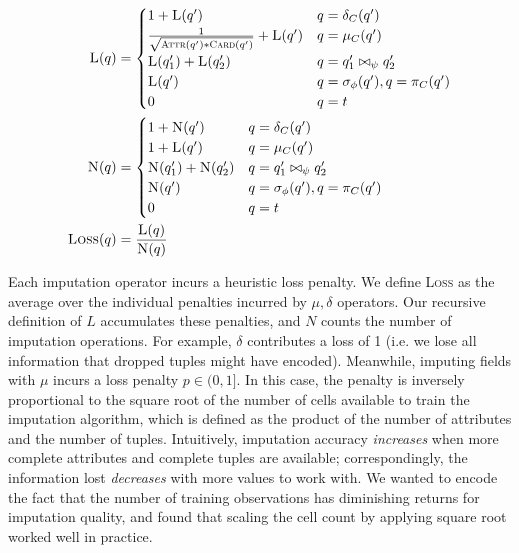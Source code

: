 \begin{align*}
  \textsc{L}(q) &= \begin{cases}
     1 + \textsc{L}(q') & q = \delta_C(q') \\
    \frac{1}{\sqrt{ \textsc{Attr}(q') * \textsc{Card}(q')}} + \textsc{L}(q')  & q = \mu_C(q') \\
    \textsc{L}(q_1') + \textsc{L}(q_2') & q = q_1' \bowtie_\psi q_2' \\
    \textsc{L}(q') & q = \sigma_\phi(q'), q = \pi_C(q') \\
    0 & q = t\\
  \end{cases}\\
    \textsc{N}(q) &= \begin{cases}
     1 + \textsc{N}(q') & q = \delta_C(q') \\
     1 + \textsc{L}(q')  & q = \mu_C(q') \\
    \textsc{N}(q_1') + \textsc{N}(q_2') & q = q_1' \bowtie_\psi q_2' \\
    \textsc{N}(q') & q = \sigma_\phi(q'), q = \pi_C(q') \\
    0 & q = t\\
  \end{cases}\\
  \textsc{Loss}(q) &= \frac{\textsc{L}(q)}{\textsc{N}(q)}
\end{align*}

Each imputation operator incurs a heuristic loss penalty. We define \textsc{Loss} as the average over the individual penalties incurred
by $\mu,\delta$ operators. Our recursive definition of $L$ accumulates these penalties, and $N$ counts the number of imputation operations.
For example, $\delta$ contributes a loss of 1 (i.e. we lose all information  that dropped tuples
might have encoded). Meanwhile, imputing \nullv{} fields with $\mu$ incurs a loss penalty $p \in (0, 1]$. In this case, the penalty is
inversely proportional to the square root of the number of cells available to train the imputation algorithm, which is defined as
the product of the number of attributes and the number of tuples. Intuitively, imputation
accuracy \textit{increases} when more complete attributes and complete tuples are available;
correspondingly, the information lost \textit{decreases} with more values to work
with. We wanted to encode the fact that the number of training observations has diminishing returns for imputation quality,
and found that scaling the cell count by applying square root worked well in practice.

